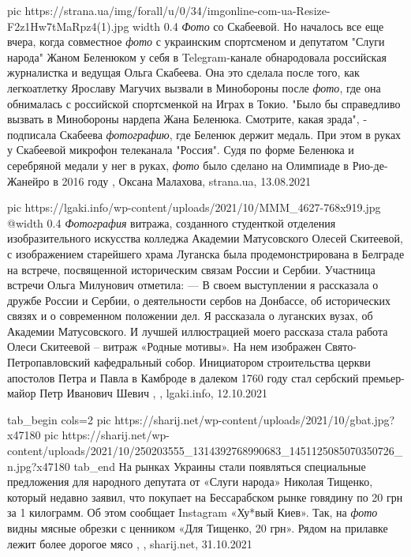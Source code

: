 \ifcmt
  pic https://strana.ua/img/forall/u/0/34/imgonline-com-ua-Resize-F2z1Hw7tMaRpz4(1).jpg
  width 0.4
\fi
\emph{Фото} со Скабеевой.  Но началось все еще вчера, когда совместное \emph{фото} с
украинским спортсменом и депутатом "Слуги народа" Жаном Беленюком у себя в
Telegram-канале обнародовала российская журналистка и ведущая Ольга Скабеева.
Она это сделала после того, как легкоатлетку Ярославу Магучих вызвали в
Минобороны после \emph{фото}, где она обнималась с российской спортсменкой на Играх в
Токио.  "Было бы справедливо вызвать в Минобороны нардепа Жана Беленюка.
Смотрите, какая зрада", - подписала Скабеева \emph{фотографию}, где Беленюк держит
медаль. При этом в руках у Скабеевой микрофон телеканала "Россия".  Судя по
форме Беленюка и серебряной медали у нег в руках, \emph{фото} было сделано на
Олимпиаде в Рио-де-Жанейро в 2016 году
, 
Оксана Малахова, strana.ua, 13.08.2021

\ifcmt
  pic https://lgaki.info/wp-content/uploads/2021/10/MMM_4627-768x919.jpg
  @width 0.4
\fi
\emph{Фотография} витража, созданного студенткой отделения изобразительного искусства
колледжа Академии Матусовского Олесей Скитеевой, с изображением старейшего
храма Луганска была продемонстрирована в Белграде на встрече, посвященной
историческим связам России и Сербии.  Участница встречи Ольга Милунович
отметила: — В своем выступлении я рассказала о дружбе России и Сербии, о
деятельности сербов на Донбассе, об исторических связях и о современном
положении дел. Я рассказала о луганских вузах, об Академии Матусовского. И
лучшей иллюстрацией моего рассказа стала работа Олеси Скитеевой – витраж
«Родные мотивы». На нем изображен Свято-Петропавловский кафедральный собор.
Инициатором строительства церкви апостолов Петра и Павла в Камброде в далеком
1760 году стал сербский премьер-майор Петр Иванович Шевич
, , lgaki.info, 12.10.2021


\ifcmt
  tab_begin cols=2
     pic https://sharij.net/wp-content/uploads/2021/10/gbat.jpg?x47180
     pic https://sharij.net/wp-content/uploads/2021/10/250203555_1314392768990683_1451125085070350726_n.jpg?x47180
  tab_end
\fi
На рынках Украины стали появляться специальные предложения для народного
депутата от «Слуги народа» Николая Тищенко, который недавно заявил, что
покупает на Бессарабском рынке говядину по 20 грн за 1 килограмм. Об этом
сообщает Instagram «Ху*вый Киев».  Так, на \emph{фото} видны мясные обрезки с ценником
«Для Тищенко, 20 грн». Рядом на прилавке лежит более дорогое мясо
, 
, sharij.net, 31.10.2021

